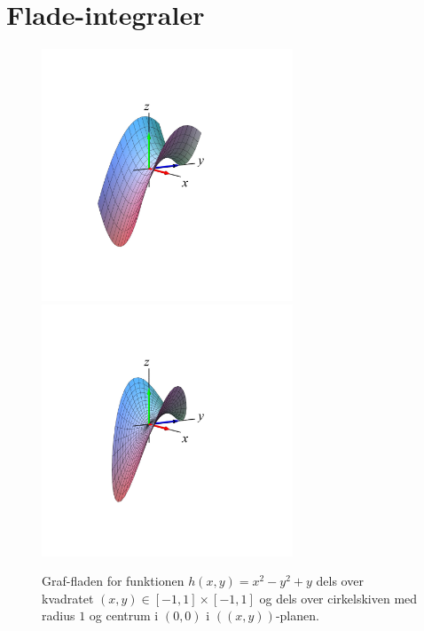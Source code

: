 




\section{Flade-integraler} \label{secFladeInt}



\begin{figure}[ht]
\centerline{\includegraphics[height=75mm]{FIGS/plotGraf1} \includegraphics[height=75mm]{FIGS/plotGraf2}}
\begin{center}
\caption{\small{Graf-fladen for funktionen $h(x,y)= x^{2} - y^{2} + y$ dels over kvadratet $(x,y) \in [-1,1]\times [-1,1]$ og dels over cirkelskiven med radius $1$ og centrum i $(0, 0)$ i $((x,y))$-planen. }} \label{figGrafflade}
\end{center}
\end{figure}


